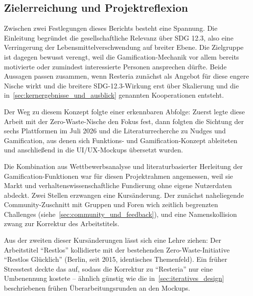 \subsection{Zielerreichung und Projektreflexion}\label{sec:evaluation_reflexion}

Zwischen zwei Festlegungen dieses Berichts besteht eine Spannung. Die Einleitung begründet die gesellschaftliche Relevanz über \ac{SDG} 12.3, also eine Verringerung der Lebensmittelverschwendung auf breiter Ebene. Die Zielgruppe ist dagegen bewusst verengt, weil die Gamification-Mechanik vor allem bereits motivierte oder zumindest interessierte Personen ansprechen dürfte. Beide Aussagen passen zusammen, wenn Resteria zunächst als Angebot für diese engere Nische wirkt und die breitere \ac{SDG}-12.3-Wirkung erst über Skalierung und die in~\autoref{sec:kernergebnisse_und_ausblick} genannten Kooperationen entsteht.

Der Weg zu diesem Konzept folgte einer erkennbaren Abfolge: Zuerst legte diese Arbeit mit der Zero-Waste-Nische den Fokus fest, dann folgten die Sichtung der sechs Plattformen im Juli 2026 und die Literaturrecherche zu Nudges und Gamification, aus denen sich Funktions- und Gamification-Konzept ableiteten und anschließend in die UI/UX-Mockups übersetzt wurden.

Die Kombination aus Wettbewerbsanalyse und literaturbasierter Herleitung der Gamification-Funktionen war für diesen Projektrahmen angemessen, weil sie Markt und verhaltenswissenschaftliche Fundierung ohne eigene Nutzerdaten abdeckt. Zwei Stellen erzwangen eine Kursänderung. Der zunächst naheliegende Community-Zuschnitt mit Gruppen und Foren wich zeitlich begrenzten Challenges (siehe~\autoref{sec:community_und_feedback}), und eine Namenskollision zwang zur Korrektur des Arbeitstitels.

Aus der zweiten dieser Kursänderungen lässt sich eine Lehre ziehen: Der Arbeitstitel \enquote{Restlos} kollidierte mit der bestehenden Zero-Waste-Initiative \enquote{Restlos Glücklich} (Berlin, seit 2015, identisches Themenfeld). Ein früher Stresstest deckte das auf, sodass die Korrektur zu \enquote{Resteria} nur eine Umbenennung kostete – ähnlich günstig wie die in~\autoref{sec:iteratives_design} beschriebenen frühen Überarbeitungsrunden an den Mockups.
